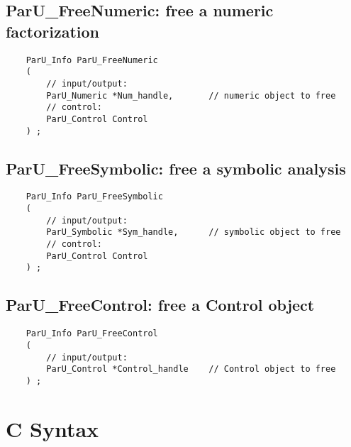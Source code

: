 \documentclass[12pt]{article}
\begin{document}
\subsection{{\sf ParU\_FreeNumeric}: free a numeric factorization}

    {\footnotesize
    \begin{verbatim}
    ParU_Info ParU_FreeNumeric
    (
        // input/output:
        ParU_Numeric *Num_handle,       // numeric object to free
        // control:
        ParU_Control Control
    ) ; \end{verbatim} }

\subsection{{\sf ParU\_FreeSymbolic}: free a symbolic analysis}

    {\footnotesize
    \begin{verbatim}
    ParU_Info ParU_FreeSymbolic
    (
        // input/output:
        ParU_Symbolic *Sym_handle,      // symbolic object to free
        // control:
        ParU_Control Control
    ) ; \end{verbatim} }

\subsection{{\sf ParU\_FreeControl}: free a Control object}

    {\footnotesize
    \begin{verbatim}
    ParU_Info ParU_FreeControl
    (
        // input/output:
        ParU_Control *Control_handle    // Control object to free
    ) ; \end{verbatim} }

\section{C Syntax}
\end{document}
